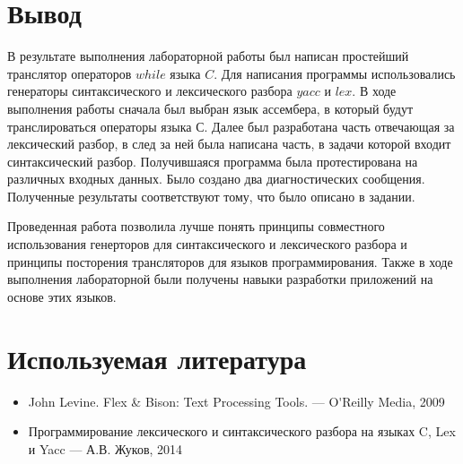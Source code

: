 \section{Вывод}
    В результате выполнения лабораторной работы был написан простейший 
    транслятор операторов $while$ языка $C$. Для написания программы
    использовались генераторы синтаксического и лексического разбора
    $yacc$ и $lex$. 
    В ходе выполнения работы сначала был выбран язык ассембера, в который
    будут транслироваться операторы языка С. 
    Далее был разработана часть отвечающая за лексический разбор, в след за
    ней была написана часть, в задачи которой входит синтаксический разбор.
    Получившаяся программа была протестирована на различных входных данных.
    Было создано два диагностических сообщения.
    Полученные результаты соответствуют тому, что было описано в задании.

    Проведенная работа позволила лучше понять принципы совместного
    использования генерторов для синтаксического и лексического разбора и
    принципы посторения трансляторов для языков программирования.
    Также в ходе выполнения лабораторной были получены навыки разработки
    приложений на основе этих языков.


\section{Используемая литература}
    \begin{itemize}
        \item John Levine. Flex \& Bison: Text Processing Tools. — O\'{}Reilly Media, 2009
        \item Программирование лексического и синтаксического разбора на языках C, Lex и Yacc — А.В. Жуков, 2014
    \end{itemize}


